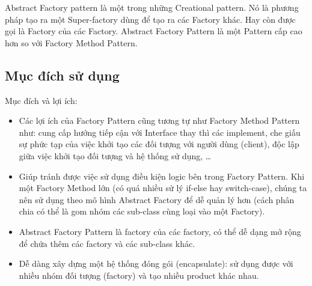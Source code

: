 Abstract Factory pattern là một trong những Creational pattern. Nó là phương pháp tạo ra một Super-factory dùng để tạo ra các Factory khác. Hay còn được gọi là Factory của các Factory. Abstract Factory Pattern là một Pattern cấp cao hơn so với Factory Method Pattern.

\subsection{Mục đích sử dụng}
Mục đích và lợi ích:
\begin{itemize}
	\item	Các lợi ích của Factory Pattern cũng tương tự như Factory Method Pattern như: cung cấp hướng tiếp cận với Interface thay thì các implement, che giấu sự phức tạp của việc khởi tạo các đối tượng với người dùng (client), độc lập giữa việc khởi tạo đối tượng và hệ thống sử dụng, …
	\item   Giúp tránh được việc sử dụng điều kiện logic bên trong Factory Pattern. Khi một Factory Method lớn (có quá nhiều sử lý if-else hay switch-case), chúng ta nên sử dụng theo mô hình Abstract Factory để dễ quản lý hơn (cách phân chia có thể là gom nhóm các sub-class cùng loại vào một Factory).
	\item   Abstract Factory Pattern là factory của các factory, có thể dễ dạng mở rộng để chứa thêm các factory và các sub-class khác.
	\item 	Dễ dàng xây dựng một hệ thống đóng gói (encapsulate): sử dụng được với nhiều nhóm đối tượng (factory) và tạo nhiều product khác nhau.
\end{itemize}

